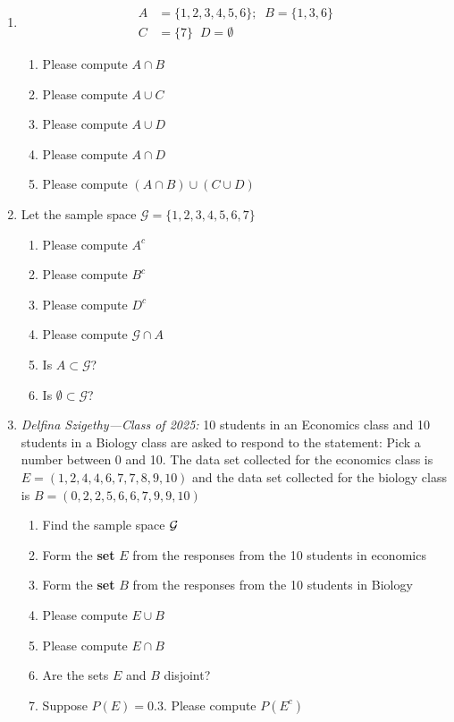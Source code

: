 \begin{enumerate}
    \item \begin{align*}
              A &= \{1,2,3,4,5,6\};
              \;\;B = \{1,3,6\} \\
              C &= \{7\}  
              \;\;D = \emptyset
           \end{align*}
    \begin{enumerate}
        \item Please compute $A \cap B$
        \item Please compute $A \cup C$
        \item Please compute $A \cup D$
        \item Please compute $A \cap D$
        \item Please compute $(A \cap B) \cup (C \cup D)$
    \end{enumerate}
    \item Let the sample space $\mathcal{G} = \{ 1,2,3,4,5,6,7 \}$
    \begin{enumerate}
       \item Please compute $A^{c}$
       \item Please compute $B^{c}$
       \item Please compute $D^{c}$
       \item Please compute $\mathcal{G} \cap A$
       \item Is $A \subset \mathcal{G}$?
       \item Is $\emptyset \subset \mathcal{G}$?
    \end{enumerate}
    
    \item \textit{Delfina Szigethy---Class of 2025:} 10 students in an Economics class and 10 students in a Biology class are asked to respond to the statement: Pick a number between 0 and 10. The data set collected for the economics class is $E = (1, 2, 4, 4, 6, 7, 7, 8, 9, 10)$ and the data set collected for the biology class is $B = (0, 2, 2, 5, 6, 6, 7, 9, 9, 10)$
    \begin{enumerate}
        \item Find the sample space $\mathcal{G}$
        \item Form the \textbf{set} $E$ from the responses from the 10 students in economics
        \item Form the \textbf{set} $B$ from the responses from the 10 students in Biology
        \item Please compute $E \cup B$
        \item Please compute $E \cap B$
        \item Are the sets $E$ and $B$ disjoint? 
        \item Suppose $P(E) = 0.3$. Please compute $P(E^{c})$
    \end{enumerate}
    

\end{enumerate}
